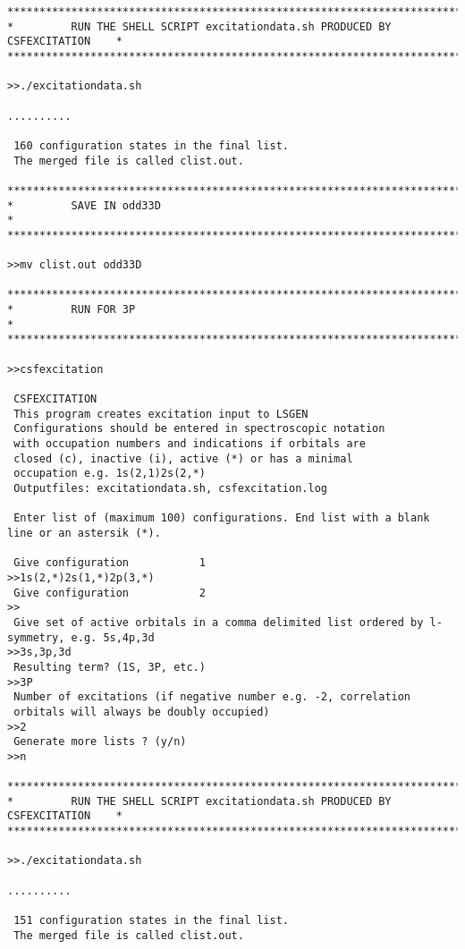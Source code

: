 \documentclass[fleqn,10pt]{book}
\begin{document}
\begin{verbatim}
*******************************************************************************
*         RUN THE SHELL SCRIPT excitationdata.sh PRODUCED BY CSFEXCITATION    *
*******************************************************************************

>>./excitationdata.sh

..........

 160 configuration states in the final list.
 The merged file is called clist.out.

*******************************************************************************
*         SAVE IN odd33D                                                     *
*******************************************************************************

>>mv clist.out odd33D

*******************************************************************************
*         RUN FOR 3P                                                          *
*******************************************************************************

>>csfexcitation

 CSFEXCITATION
 This program creates excitation input to LSGEN
 Configurations should be entered in spectroscopic notation
 with occupation numbers and indications if orbitals are
 closed (c), inactive (i), active (*) or has a minimal
 occupation e.g. 1s(2,1)2s(2,*)
 Outputfiles: excitationdata.sh, csfexcitation.log

 Enter list of (maximum 100) configurations. End list with a blank line or an astersik (*).

 Give configuration           1
>>1s(2,*)2s(1,*)2p(3,*)
 Give configuration           2
>>
 Give set of active orbitals in a comma delimited list ordered by l-symmetry, e.g. 5s,4p,3d
>>3s,3p,3d
 Resulting term? (1S, 3P, etc.)
>>3P
 Number of excitations (if negative number e.g. -2, correlation 
 orbitals will always be doubly occupied)                        
>>2
 Generate more lists ? (y/n)
>>n

*******************************************************************************
*         RUN THE SHELL SCRIPT excitationdata.sh PRODUCED BY CSFEXCITATION    *
*******************************************************************************

>>./excitationdata.sh

..........

 151 configuration states in the final list.
 The merged file is called clist.out.


\end{verbatim}
\end{document}
